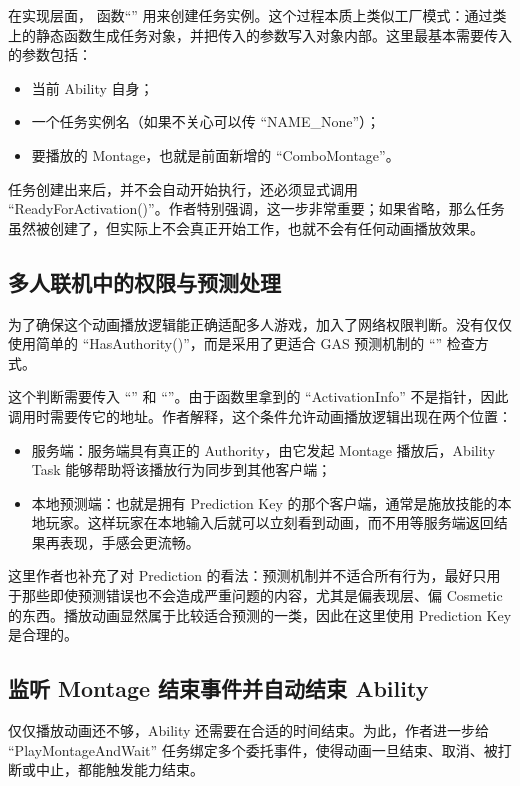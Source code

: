 在实现层面， 函数``'' 用来创建任务实例。这个过程本质上类似工厂模式：通过类上的静态函数生成任务对象，并把传入的参数写入对象内部。这里最基本需要传入的参数包括：
\begin{itemize}
	\item 当前 Ability 自身；
	\item 一个任务实例名（如果不关心可以传 ``NAME\_None''）；
	\item 要播放的 Montage，也就是前面新增的 ``ComboMontage''。
\end{itemize}

任务创建出来后，并不会自动开始执行，还必须显式调用 ``ReadyForActivation()''。作者特别强调，这一步非常重要；如果省略，那么任务虽然被创建了，但实际上不会真正开始工作，也就不会有任何动画播放效果。

\subsection{多人联机中的权限与预测处理}
为了确保这个动画播放逻辑能正确适配多人游戏，加入了网络权限判断。没有仅仅使用简单的 ``HasAuthority()''，而是采用了更适合 GAS 预测机制的 ``'' 检查方式。

这个判断需要传入 ``'' 和 ``''。由于函数里拿到的 ``ActivationInfo'' 不是指针，因此调用时需要传它的地址。作者解释，这个条件允许动画播放逻辑出现在两个位置：
\begin{itemize}
	\item 服务端：服务端具有真正的 Authority，由它发起 Montage 播放后，Ability Task 能够帮助将该播放行为同步到其他客户端；
	\item 本地预测端：也就是拥有 Prediction Key 的那个客户端，通常是施放技能的本地玩家。这样玩家在本地输入后就可以立刻看到动画，而不用等服务端返回结果再表现，手感会更流畅。
\end{itemize}
这里作者也补充了对 Prediction 的看法：预测机制并不适合所有行为，最好只用于那些即使预测错误也不会造成严重问题的内容，尤其是偏表现层、偏 Cosmetic 的东西。播放动画显然属于比较适合预测的一类，因此在这里使用 Prediction Key 是合理的。

\subsection{监听 Montage 结束事件并自动结束 Ability}

仅仅播放动画还不够，Ability 还需要在合适的时间结束。为此，作者进一步给 ``PlayMontageAndWait'' 任务绑定多个委托事件，使得动画一旦结束、取消、被打断或中止，都能触发能力结束。

